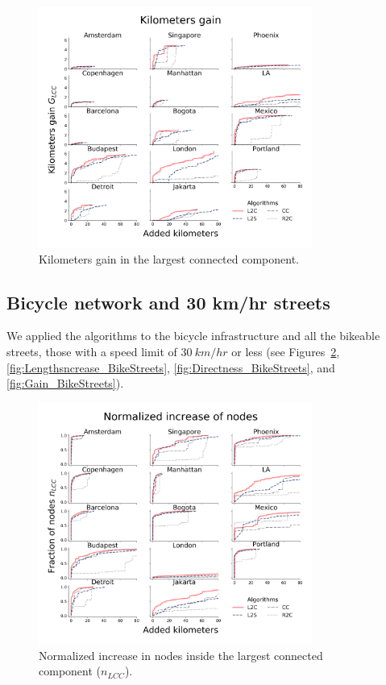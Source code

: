 \begin{figure}[h!]
  \centering
  \includegraphics[width=0.8\textwidth]{images/datadriven/SI_Gain.png}
  \caption{Kilometers gain in the largest connected component.}
  \label{fig:Gain}
\end{figure}


\subsection{Bicycle network and 30 km/hr streets}\label{SI:BikeStreets}
We applied the algorithms to the bicycle infrastructure and all the bikeable streets, those with a speed limit of $30\ km/hr$ or less (see Figures~\ref{fig:NodesIncrease_BikeStreets}, \ref{fig:Lengthsncrease_BikeStreets}, \ref{fig:Directness_BikeStreets}, and \ref{fig:Gain_BikeStreets}).

\begin{figure}[h!]
  \centering
  \includegraphics[width=0.8\textwidth]{images/datadriven/SI_Nodes_Bike_Streets.png}
  \caption{Normalized increase in nodes inside the largest connected component ($n_{LCC}$).}
  \label{fig:NodesIncrease_BikeStreets}
\end{figure}

